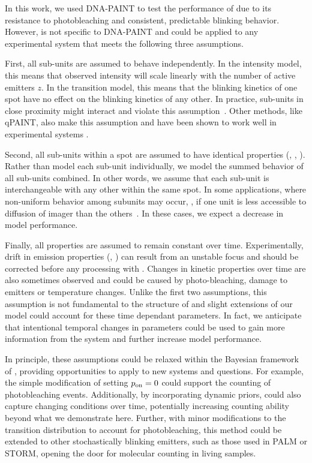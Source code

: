 In this work, we used DNA-PAINT to test the performance of \ours 
due to its resistance to photobleaching and consistent, 
predictable blinking behavior.
  However, \ours is not specific to DNA-PAINT and could be 
  applied to any experimental system that meets the following three assumptions.

  First, all sub-units are assumed to behave independently.
  In the intensity model, this means that observed intensity will scale
  linearly with the number of active emitters $z$.
  In the transition model, this means that the blinking kinetics of one spot
  have no effect on the blinking kinetics of any other.
  In practice, sub-units in close proximity might 
  interact and violate this assumption~\citep{helmerich_photoswitching_2022}. 
  Other methods, like qPAINT, also make this assumption and have been shown to
  work well in experimental systems \citep{fischer_quantitative_2021,
  jayasinghe_true_2018}. 

  Second, all sub-units within a spot are assumed to have identical properties
  (\pon, \poff, \re).
  Rather than model each sub-unit individually, we model the summed behavior
  of all sub-units combined. 
  In other words, we assume that each sub-unit is
  interchangeable with any other within the same spot.
  In some applications, where non-uniform behavior among subunits may occur, \eg,
  if one unit is less accessible to diffusion of
  imager than the others~\citep{civitci_2020}. 
  In these cases, we expect a decrease in model performance.

Finally, all properties are assumed to remain constant over time. 
  Experimentally, drift in emission properties (\re, \rb) can result from 
  an unstable focus and should be corrected before any processing with
  \ours.
  Changes in kinetic properties over time are also sometimes observed and could
  be caused by photo-bleaching, damage to emitters or temperature changes. 
  Unlike the first two assumptions, this assumption is not fundamental to the
  structure of \ours and slight extensions of our model could account for these
  time dependant parameters.
  In fact, we anticipate that intentional temporal changes in parameters could be used to gain more
  information from the system and further increase model performance.

In principle, these assumptions could be relaxed within the Bayesian framework of \ours,
providing opportunities to apply \ours to new systems and questions.
    For example, the simple modification of setting $p_\text{on}=0$ could support the
    counting of photobleaching events.
    Additionally, by incorporating dynamic priors, \ours could also capture
    changing conditions over time, potentially increasing counting
    ability beyond what we demonstrate here.
    Further, with minor modifications to the transition distribution to account
    for photobleaching, this method could be extended to other stochastically
    blinking emitters, such as those used in PALM or STORM, opening the door
    for molecular counting in living samples.
